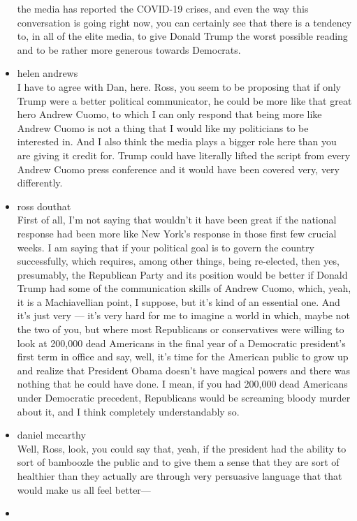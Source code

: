 \begin{itemize}
  the media has reported the COVID-19 crises, and even the way this
  conversation is going right now, you can certainly see that there is a
  tendency to, in all of the elite media, to give Donald Trump the worst
  possible reading and to be rather more generous towards Democrats.
\item
  helen andrews\\
  I have to agree with Dan, here. Ross, you seem to be proposing that if
  only Trump were a better political communicator, he could be more like
  that great hero Andrew Cuomo, to which I can only respond that being
  more like Andrew Cuomo is not a thing that I would like my politicians
  to be interested in. And I also think the media plays a bigger role
  here than you are giving it credit for. Trump could have literally
  lifted the script from every Andrew Cuomo press conference and it
  would have been covered very, very differently.
\item
  ross douthat\\
  First of all, I'm not saying that wouldn't it have been great if the
  national response had been more like New York's response in those
  first few crucial weeks. I am saying that if your political goal is to
  govern the country successfully, which requires, among other things,
  being re-elected, then yes, presumably, the Republican Party and its
  position would be better if Donald Trump had some of the communication
  skills of Andrew Cuomo, which, yeah, it is a Machiavellian point, I
  suppose, but it's kind of an essential one. And it's just very ---
  it's very hard for me to imagine a world in which, maybe not the two
  of you, but where most Republicans or conservatives were willing to
  look at 200,000 dead Americans in the final year of a Democratic
  president's first term in office and say, well, it's time for the
  American public to grow up and realize that President Obama doesn't
  have magical powers and there was nothing that he could have done. I
  mean, if you had 200,000 dead Americans under Democratic precedent,
  Republicans would be screaming bloody murder about it, and I think
  completely understandably so.
\item
  daniel mccarthy\\
  Well, Ross, look, you could say that, yeah, if the president had the
  ability to sort of bamboozle the public and to give them a sense that
  they are sort of healthier than they actually are through very
  persuasive language that that would make us all feel better---
\item

\end{itemize}
